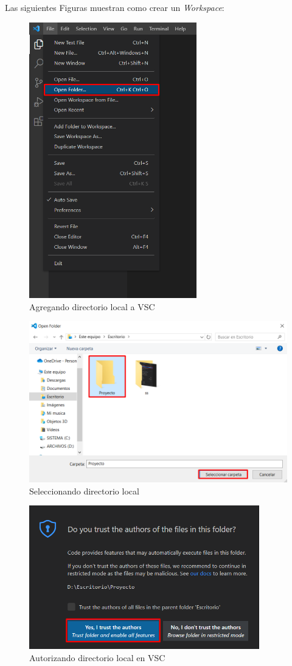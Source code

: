 Las siguientes Figuras muestran como crear un \textit{Workspace}:
\begin{figure}[H]
    \centering
    \caption{Agregando directorio local a VSC}
    \label{fig: 4}
    \includegraphics[height=12cm]{capturas/creando_w1.png}
\end{figure}
\begin{figure}[H]
    \centering
    \caption{Seleccionando directorio local}
    \label{fig: 5}
    \includegraphics[width=12cm]{capturas/creando_w2.png}
\end{figure}
\begin{figure}[H]
    \centering
    \caption{Autorizando directorio local en VSC}
    \label{fig: 6}
    \includegraphics[width=10cm]{capturas/creando_w3.png}
\end{figure}

